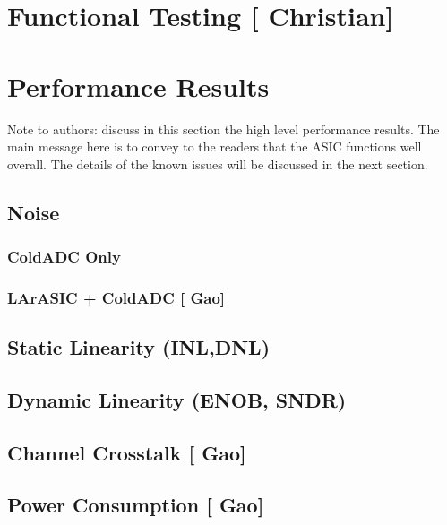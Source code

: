 \documentclass[10pt]{article}
\begin{document}

\section{Functional Testing [{\color{red} Christian}] }


	

\section{Performance Results}
Note to authors: discuss in this section the high level performance results. The main message here is to convey to the readers that the ASIC functions well overall. The details of the known issues will be discussed in the next section.

\subsection{Noise}
\subsubsection{ColdADC Only}
\subsubsection{LArASIC + ColdADC  [{\color{red} Gao}] }


\subsection{Static Linearity (INL,DNL)}

\subsection{Dynamic Linearity (ENOB, SNDR)}

\subsection{Channel Crosstalk [{\color{red} Gao}] }


\subsection{Power Consumption [{\color{red} Gao}] }


\end{document}
